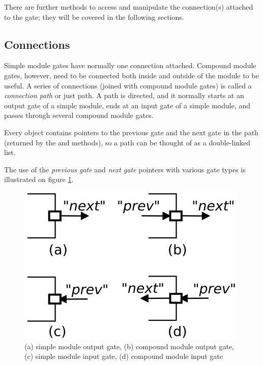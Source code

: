 There are further  methods to access and manipulate
the connection(s) attached to the gate; they will be covered in the
following sections.


\subsection{Connections}
\label{sec:simple-modules:connections}

Simple module gates have normally one connection attached. Compound module
gates, however, need to be connected both inside and outside of the
module to be useful. A series of connections (joined with compound
module gates) is called a \textit{connection path} or just path.
A path is directed, and it normally starts at an output gate of
a simple module, ends at an input gate of a simple module,
and passes through several compound module gates.

Every  object contains pointers to the previous gate
and the next gate in the path (returned by the 
and  methods), so a path can be thought of as
a double-linked list.

The use of the \textit{previous gate} and \textit{next gate} pointers
with various gate types is illustrated on figure
\ref{fig:ch-simple-modules:gates}.

\begin{figure}[htbp]
\begin{center}
\includegraphics{figures/simple-gates}
\caption{(a) simple module output gate, (b) compound module output gate,
         (c) simple module input gate, (d) compound module input gate}
\label{fig:ch-simple-modules:gates}
\end{center}
\end{figure}

